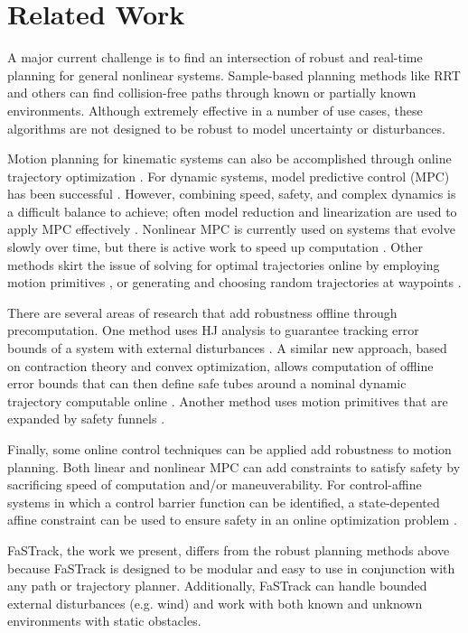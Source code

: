 \section{Related Work \label{sec:relatedwork}}
A major current challenge is to find an intersection of robust and real-time planning for general nonlinear systems. Sample-based planning methods like RRT \cite{Kuffner2000} and others \cite{Kavraki1996,Janson2015,Richter2016, Karaman2011, Kobilarov2012} can find collision-free paths through known or partially known environments. Although extremely effective in a number of use cases, these algorithms are not designed to be robust to model uncertainty or disturbances.

Motion planning for kinematic systems can also be accomplished through online trajectory optimization \cite{Schulman2013,Ratliff2009}. For dynamic systems, model predictive control (MPC) has been successful \cite{Qin2003}. However, combining speed, safety, and complex dynamics is a difficult balance to achieve; often model reduction and linearization are used to apply MPC effectively \cite{Vitus2008, Zeilinger2011, Richter2012}. Nonlinear MPC is currently used on systems that evolve slowly over time, but there is active work to speed up computation \cite{Diehl2002, Schildbach2016,Diehl2009, Neunert2016}. Other methods skirt the issue of solving for optimal trajectories online by employing motion primitives \cite{Gillula2010, Dey2016}, or generating and choosing random trajectories at waypoints \cite{Kalakrishnan2011, Schwesinger2013}. 

There are several areas of research that add robustness offline through precomputation.  One method uses HJ analysis to guarantee tracking error bounds of a system with external disturbances \cite{Bansal2017}. A similar new approach, based on contraction theory and convex optimization, allows computation of offline error bounds that can then define safe tubes around a nominal dynamic trajectory computable online \cite{Singh2017}.  Another method uses motion primitives that are expanded by safety funnels \cite{Majumdar2017}.

Finally, some online control techniques can be applied add robustness to motion planning. Both linear and nonlinear MPC can add constraints to satisfy safety \cite{Richards2006, DiCairano2016,Hoy2015} by sacrificing speed of computation and/or maneuverability. For control-affine systems in which a control barrier function can be identified, a state-depented affine constraint can be used to ensure safety in an online optimization problem \cite{Ames2014}.

FaSTrack, the work we present, differs from the robust planning methods above because FaSTrack is designed to be modular and easy to use in conjunction with any path or trajectory planner. Additionally, FaSTrack can handle bounded external disturbances (e.g. wind) and work with both known and unknown environments with static obstacles.